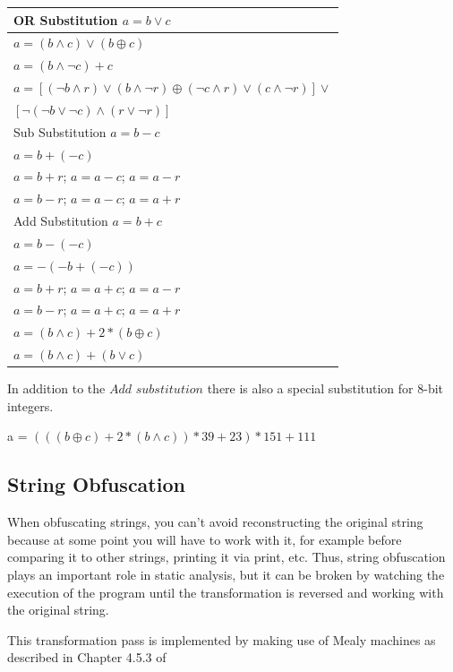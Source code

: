 \begin{center}
\begin{tabular}{|l|}
  \hline
  OR Substitution $a = b \lor c$ \\
  \hline
  $a = (b \land c) \lor (b \oplus c)$ \\
  $a = (b \land \neg c) + c$ \\
  $a = [(\neg b \land r) \lor (b \land \neg r) \oplus (\neg c \land r) \lor (c \land \neg r)] \lor $ \\
  $[\neg(\neg b \lor \neg c) \land (r \lor \neg r)]$ \\
  \hline
  Sub Substitution $a = b - c$ \\
  \hline
  $a = b + (-c)$ \\
  $a = b + r$; $a = a - c$; $a = a - r$  \\
  $a = b - r$; $a = a - c$; $a = a + r$  \\
  \hline
  Add Substitution $a = b + c$ \\
  \hline
  $a = b - (-c)$ \\
  $a = -(-b + (-c))$ \\
  $a = b + r$; $a = a + c$; $a = a - r$ \\
  $a = b - r$; $a = a + c$; $a = a + r$ \\
  $a = (b \land c) + 2 * (b \oplus c)$ \\
  $a = (b \land c) + (b \lor c)$ \\
  \hline
\end{tabular}
\end{center}

In addition to the $Add$ $substitution$ there is also a special substitution for 8-bit integers.

     a = $(((b \oplus c) + 2 * (b \land c)) * 39 + 23) * 151 + 111$

\subsection{String Obfuscation}

When obfuscating strings, you can't avoid reconstructing the original string because at some point you will have to work with it, for example before comparing it to other strings, printing it via print, etc.
Thus, string obfuscation plays an important role in static analysis, but it can be broken by watching the execution of the program until the transformation is reversed and working with the original string.

This transformation pass is implemented by making use of Mealy machines as described in Chapter 4.5.3 of \cite{ss-chpt4}

